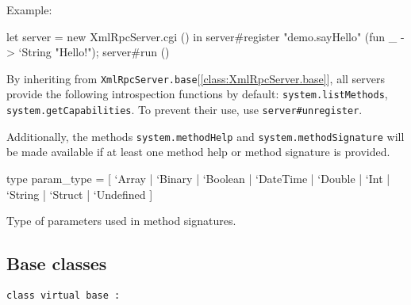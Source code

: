 \documentclass[11pt]{article}
\begin{document}
\ocamldocvspace{0.5cm}



Example: \begin{ocamldoccode}

    let server = new XmlRpcServer.cgi () in
    server#register "demo.sayHello"
      (fun _ -> `String "Hello!");
    server#run () 
\end{ocamldoccode}



    By inheriting from {\tt{XmlRpcServer.base}}[\ref{class:XmlRpcServer.base}], all servers provide
    the following introspection functions by default: {\tt{system.listMethods}},
    {\tt{system.getCapabilities}}. To prevent their use, use {\tt{server\verb`#`unregister}}.


    Additionally, the methods {\tt{system.methodHelp}} and {\tt{system.methodSignature}}
    will be made available if at least one method help or method signature is
    provided.



\label{type:XmlRpcServer.param-underscoretype}\begin{ocamldoccode}
type param_type = [ `Array
  | `Binary
  | `Boolean
  | `DateTime
  | `Double
  | `Int
  | `String
  | `Struct
  | `Undefined ] 
\end{ocamldoccode}
\begin{ocamldocdescription}
Type of parameters used in method signatures.


\end{ocamldocdescription}




\subsection{Base classes}




\begin{ocamldoccode}
{\tt{class virtual base : }}\end{ocamldoccode}
\label{class:XmlRpcServer.base}
\end{document}
